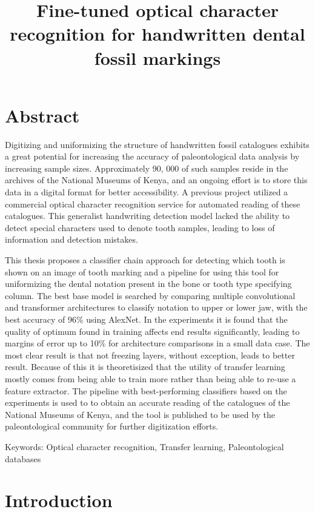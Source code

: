 \documentclass{article}
\title{Fine-tuned optical character recognition for handwritten dental fossil markings}
\begin{document}
\tableofcontents

\section{Abstract}

Digitizing and uniformizing the structure of handwritten fossil catalogues exhibits a great 
potential for increasing the accuracy of paleontological data analysis by increasing sample sizes. 
Approximately 90, 000 of such samples reside in the archives of the National Museums of Kenya, and 
an ongoing effort is to store this data in a digital format for better accessibility.
A previous project utilized a commercial optical character recognition service for automated reading of these catalogues. This generalist
handwriting detection model lacked the ability to detect special characters used to denote tooth samples,
 leading to loss of information and detection mistakes.

This thesis proposes a classifier chain approach for detecting which tooth is shown on an image of tooth marking 
and a pipeline for using this tool for uniformizing the dental notation present in 
the bone or tooth type specifying column. The best base model is searched by comparing multiple convolutional and transformer architectures
to classify notation to upper or lower jaw, with the best accuracy of 96\% using AlexNet. 
In the experiments it is found that the quality of optimum found in training affects end results significantly,
leading to margins of error up to 10\% for architecture comparisons in a small data case.
The most clear result is that not freezing layers, without exception, leads to better result.
Because of this it is theoretisized that the utility of transfer learning mostly comes from 
being able to train more rather than being able to re-use a feature extractor.
The pipeline with best-performing classifiers based on the experiments is used to
to obtain an accurate reading of the catalogues of the National Museums of Kenya, and the tool is published to be used 
by the paleontological community for further digitization efforts.

Keywords: Optical character recognition, Transfer learning, Paleontological databases

\section{Introduction}


\end{document}
